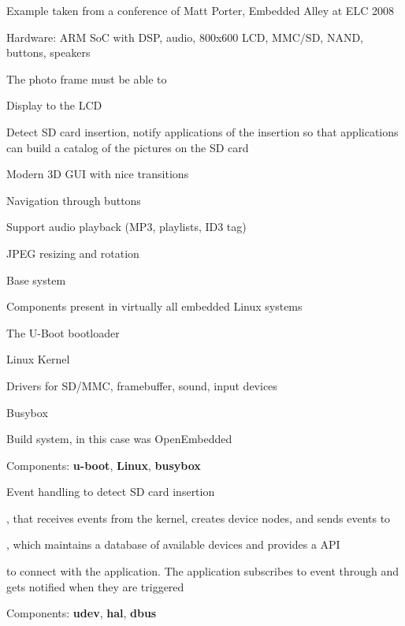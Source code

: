   \startitemize
  \item Example taken from a conference of Matt Porter, Embedded Alley
    at ELC 2008
  \item Hardware: ARM SoC with DSP, audio, 800x600 LCD, MMC/SD, NAND,
    buttons, speakers
  \item The photo frame must be able to
    \startitemize
    \item Display to the LCD
    \item Detect SD card insertion, notify applications of the
      insertion so that applications can build a catalog of the
      pictures on the SD card
    \item Modern 3D GUI with nice transitions
    \item Navigation through buttons
    \item Support audio playback (MP3, playlists, ID3 tag)
    \item JPEG resizing and rotation
    \stopitemize
  \stopitemize

  \startitemize
  \item Base system
    \startitemize
    \item Components present in virtually all embedded Linux systems
    \item The U-Boot bootloader
    \item Linux Kernel
      \startitemize
      \item Drivers for SD/MMC, framebuffer, sound, input devices
      \stopitemize
    \item Busybox
    \item Build system, in this case was OpenEmbedded
    \item Components: {\bf u-boot}, {\bf Linux}, {\bf busybox}
    \stopitemize
  \stopitemize

  \startitemize
  \item Event handling to detect SD card insertion
    \startitemize
    \item {}, that receives events from the kernel, creates device
      nodes, and sends events to 
    \item {}, which maintains a database of available devices and
      provides a  API
    \item {} to connect  with the application. The application
      subscribes to  event through  and gets notified when
      they are triggered
    \item Components: {\bf udev}, {\bf hal}, {\bf dbus}
    \stopitemize
  \stopitemize

